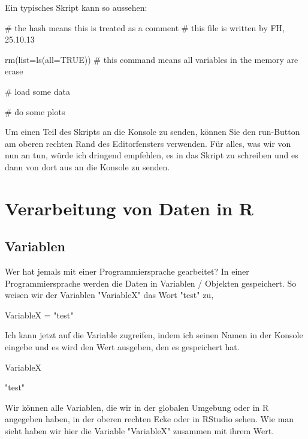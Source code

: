 \documentclass[a4paper,twoside]{tufte-book}\usepackage[]{graphicx}\usepackage[]{color}
\begin{document}
\begin{appendices}
Ein typisches Skript kann so aussehen:

\begin{Schunk}
\begin{Sinput}
# the hash means this is treated as a comment
# this file is written by FH, 25.10.13

rm(list=ls(all=TRUE))  # this command means all variables in the memory are erase

# load some data

# do some plots
\end{Sinput}
\end{Schunk}

Um einen Teil des Skripts an die Konsole zu senden, können Sie den run-Button am oberen rechten Rand des Editorfensters verwenden. Für alles, was wir von nun an tun, würde ich dringend empfehlen, es in das Skript zu schreiben und es dann von dort aus an die Konsole zu senden.

\chapter{Verarbeitung von Daten in R}
\label{HandlingDataInR}

\section{Variablen}

Wer hat jemals mit einer Programmiersprache gearbeitet? In einer Programmiersprache werden die Daten in Variablen / Objekten gespeichert. So weisen wir der Variablen "VariableX" das Wort "test" zu,

\begin{Schunk}
\begin{Sinput}
VariableX = "test"
\end{Sinput}
\end{Schunk}

Ich kann jetzt auf die Variable zugreifen, indem ich seinen Namen in der Konsole eingebe und es wird den Wert ausgeben, den es gespeichert hat.
\begin{Schunk}
\begin{Sinput}
VariableX
\end{Sinput}
\begin{Soutput}
[1] "test"
\end{Soutput}
\end{Schunk}

Wir können alle Variablen, die wir in der globalen Umgebung oder in R angegeben haben, in der oberen rechten Ecke oder in RStudio sehen. Wie man sieht haben wir hier die Variable "VariableX" zusammen mit ihrem Wert.



\end{appendices}
\end{document}
